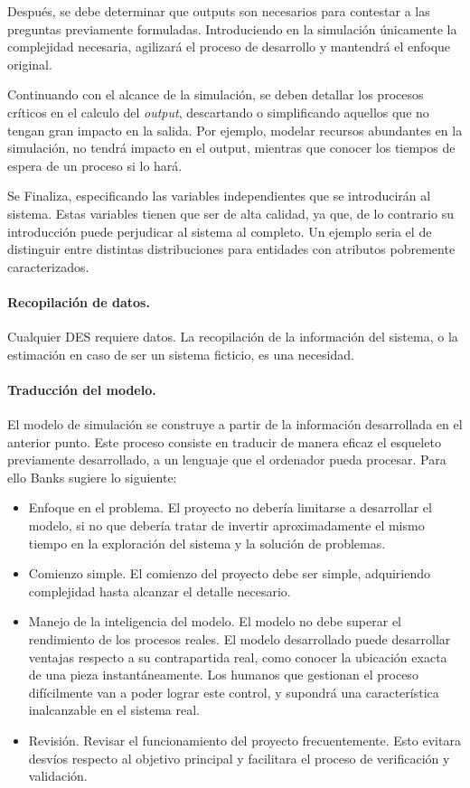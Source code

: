 Después, se debe determinar que outputs son necesarios
para contestar a las preguntas previamente formuladas.
Introduciendo en la simulación únicamente la complejidad necesaria,
agilizará el proceso de desarrollo y mantendrá el enfoque original.

Continuando con el alcance de la simulación,
se deben detallar los procesos críticos en el calculo del \textit{output},
descartando o simplificando aquellos que no tengan gran impacto en la salida.
Por ejemplo, modelar recursos abundantes en la simulación,
no tendrá impacto en el output,
mientras que conocer los tiempos de espera de un proceso si lo hará.

Se Finaliza, especificando las variables independientes
que se introducirán al sistema.
Estas variables tienen que ser de alta calidad, ya que,
de lo contrario su introducción puede perjudicar al sistema al completo.
Un ejemplo seria el de distinguir entre distintas distribuciones
para entidades con atributos pobremente caracterizados.

\paragraph{Recopilación de datos.}

Cualquier DES requiere datos. La recopilación de la información del sistema,
o la estimación en caso de ser un sistema ficticio, es una necesidad.

\paragraph{Traducción del modelo.}

El modelo de simulación se construye a partir de la información desarrollada en el anterior punto.
Este proceso consiste en traducir de manera eficaz el esqueleto previamente desarrollado,
a un lenguaje que el ordenador pueda procesar.
Para ello Banks sugiere lo siguiente:

\begin{itemize}
	\item Enfoque en el problema. El proyecto no debería limitarse a desarrollar el modelo,
		si no que debería tratar de invertir aproximadamente el mismo tiempo
		en la exploración del sistema y la solución de problemas.
	\item Comienzo simple. El comienzo del proyecto debe ser simple,
		adquiriendo complejidad hasta alcanzar el detalle necesario.
	\item Manejo de la inteligencia del modelo.
		El modelo no debe superar el rendimiento de los procesos reales.
		El modelo desarrollado puede desarrollar ventajas respecto a su contrapartida real,
		como conocer la ubicación exacta de una pieza instantáneamente.
		Los humanos que gestionan el proceso difícilmente van a poder lograr este control,
		y supondrá una característica inalcanzable en el sistema real.
	\item Revisión. Revisar el funcionamiento del proyecto frecuentemente.
		Esto evitara desvíos respecto al objetivo principal
		y facilitara el proceso de verificación y validación.
\end{itemize}

